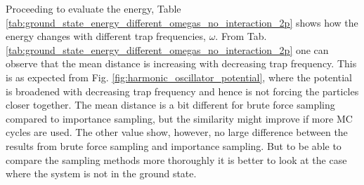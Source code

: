 Proceeding to evaluate the energy, Table \ref{tab:ground_state_energy_different_omegas_no_interaction_2p} shows how the energy changes with different trap frequencies, $\omega$. From Tab. \ref{tab:ground_state_energy_different_omegas_no_interaction_2p} one can observe that the mean distance is increasing with decreasing trap frequency.  This is as expected from Fig. \ref{fig:harmonic_oscillator_potential}, where the potential is broadened with decreasing trap frequency and hence is not forcing the particles closer together. The mean distance is a bit different for brute force sampling compared to importance sampling, but the similarity might improve if more MC cycles are used.  The other value show, however,  no large difference between the results from brute force sampling and importance sampling. But to be able to compare the sampling methods more thoroughly it is better to look at the case where the system is not in the ground state. 

